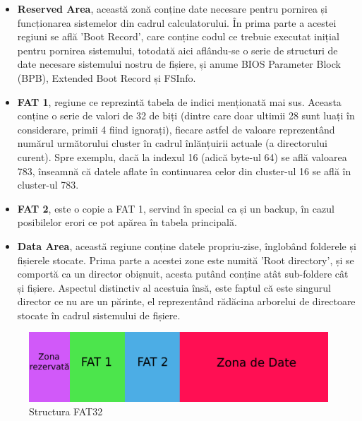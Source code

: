 \begin{itemize}
  \item \textbf{Reserved Area}, această zonă conține date necesare pentru pornirea și funcționarea sistemelor din cadrul calculatorului. În prima parte a acestei regiuni se află 'Boot Record', care conține codul ce trebuie executat inițial pentru pornirea sistemului, totodată aici aflându-se o serie de structuri de date necesare sistemului nostru de fișiere, și anume BIOS Parameter Block (BPB), Extended Boot Record și FSInfo.
  
 \item \textbf{FAT 1}, regiune ce reprezintă tabela de indici menționată mai sus. Aceasta conține o serie de valori de 32 de biți (dintre care doar ultimii 28 sunt luați în considerare, primii 4 fiind ignorați), fiecare astfel de valoare reprezentând numărul următorului cluster în cadrul înlănțuirii actuale (a directorului curent). Spre exemplu, dacă la indexul 16 (adică byte-ul 64) se află valoarea 783, înseamnă că datele aflate în continuarea celor din cluster-ul 16 se află în cluster-ul 783.
 
 \item \textbf{FAT 2}, este o copie a FAT 1, servind în special ca și un backup, în cazul posibilelor erori ce pot apărea în tabela principală.
 
 \item \textbf{Data Area}, această regiune conține datele propriu-zise, înglobând folderele și fișierele stocate. Prima parte a acestei zone este numită 'Root directory', și se comportă ca un director obișnuit, acesta putând conține atât sub-foldere cât și fișiere. Aspectul distinctiv al acestuia însă, este faptul că este singurul director ce nu are un părinte, el reprezentând rădăcina arborelui de directoare stocate în cadrul sistemului de fișiere.  
\end{itemize}


\begin{figure}[h]
    \centering
    \includegraphics[width=1.0\linewidth]{images/2.4.png}
    \caption{Structura FAT32}
    \label{fig:enter-label}
\end{figure}

\bigskip


